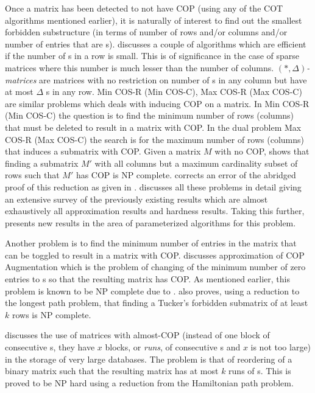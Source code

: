 Once a matrix has been detected to not have COP (using any of the COT
algorithms mentioned earlier), it is naturally of interest to find out
the smallest forbidden substructure (in terms of number of rows and/or
columns and/or number of entries that are {\un}s). \cite{d08phd}
discusses a couple of algorithms which are efficient if the number of
{\un}s in a row is small. This is of significance in the case of
sparse matrices where this number is much lesser than the number of
columns. $(*,\Delta)${\em -matrices} are matrices with no restriction
on number of {\un}s in any column but have at most $\Delta$ {\un}s in
any row. {\sc Min COS-R (Min COS-C), Max COS-R (Max COS-C)} are
similar problems which deals with inducing COP on a matrix. In {\sc
  Min COS-R (Min COS-C)} the question is to find the minimum number of
rows (columns) that must be deleted to result in a matrix with COP.
In the dual problem {\sc Max COS-R (Max COS-C)} the search is for the
maximum number of rows (columns) that induces a submatrix with
COP. Given a matrix $M$ with no COP, \cite{b75-phd} shows that finding
a submatrix $M'$ with all columns but a maximum cardinality
subset of rows such that $M'$ has COP is NP complete. \cite{hg02}
corrects an error of the abridged proof of this reduction as given in
\cite{gj79}.  \cite{d08phd} discusses all these problems in detail
giving an extensive survey of the previously existing results which
are almost exhaustively all approximation results and hardness
results. Taking this further, \cite{d08phd} presents new results in
the area of parameterized algorithms for this
problem.

Another problem is to find the minimum number of entries in the matrix
that can be toggled to result in a matrix with COP.  \cite{v85}
discusses approximation of {\sc COP Augmentation} which is the problem
of changing of the minimum number of zero entries to {\un}s so that
the resulting matrix has COP. As mentioned earlier, this problem is
known to be NP complete due to \cite{b75-phd}. \cite{v85} also proves,
using a reduction to the longest path problem, that finding a Tucker's
forbidden submatrix of at least $k$ rows is NP complete.

\cite{jkckv04} discusses the use of matrices with almost-COP (instead
of one block of consecutive {\un}s, they have $x$ blocks, or {\em
  runs}, of consecutive {\un}s and $x$ is not too large) in the
storage of very large databases.  The problem is that of reordering of
a binary matrix such that the resulting matrix has at most $k$ runs of
{\un}s. This is proved to be NP hard using a reduction from the
Hamiltonian path problem.


